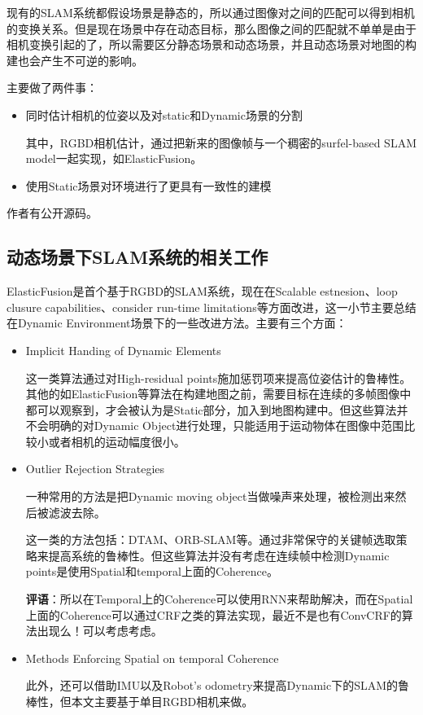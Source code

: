 现有的SLAM系统都假设场景是静态的，所以通过图像对之间的匹配可以得到相机的变换关系。但是现在场景中存在动态目标，那么图像之间的匹配就不单单是由于相机变换引起的了，所以需要区分静态场景和动态场景，并且动态场景对地图的构建也会产生不可逆的影响。

主要做了两件事：
\begin{itemize}
\item 同时估计相机的位姿以及对static和Dynamic场景的分割

其中，RGBD相机估计，通过把新来的图像帧与一个稠密的surfel-based SLAM model一起实现，如ElasticFusion。

\item 使用Static场景对环境进行了更具有一致性的建模
\end{itemize}

作者有公开源码。

\subsection{动态场景下SLAM系统的相关工作}

ElasticFusion是首个基于RGBD的SLAM系统，现在在Scalable estnesion、loop clusure capabilities、consider run-time limitations等方面改进，这一小节主要总结在Dynamic Environment场景下的一些改进方法。主要有三个方面：
\begin{itemize}
\item Implicit Handing of Dynamic Elements

这一类算法通过对High-residual points施加惩罚项来提高位姿估计的鲁棒性。其他的如ElasticFusion等算法在构建地图之前，需要目标在连续的多帧图像中都可以观察到，才会被认为是Static部分，加入到地图构建中。但这些算法并不会明确的对Dynamic Object进行处理，只能适用于运动物体在图像中范围比较小或者相机的运动幅度很小。

\item Outlier Rejection Strategies

一种常用的方法是把Dynamic moving object当做噪声来处理，被检测出来然后被滤波去除。

这一类的方法包括：DTAM、ORB-SLAM等。通过非常保守的关键帧选取策略来提高系统的鲁棒性。但这些算法并没有考虑在连续帧中检测Dynamic points是使用Spatial和temporal上面的Coherence。

{\color{red} \textbf{评语}：所以在Temporal上的Coherence可以使用RNN来帮助解决，而在Spatial上面的Coherence可以通过CRF之类的算法实现，最近不是也有ConvCRF的算法出现么！可以考虑考虑。}

\item Methods Enforcing Spatial on temporal Coherence

此外，还可以借助IMU以及Robot's odometry来提高Dynamic下的SLAM的鲁棒性，但本文主要基于单目RGBD相机来做。

\end{itemize}

